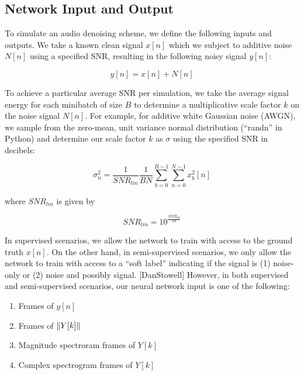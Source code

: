 
\subsection{Network Input and Output}
To simulate an audio denoising scheme, we define the following inputs and outputs. We take a known clean signal $x[n]$ which we subject to additive noise $N[n]$ using a specified SNR, resulting in the following noisy signal $y[n]$:

\begin{equation}
y[n] = x[n] + N[n]
\end{equation}

To achieve a particular average SNR per simulation, we take the average signal energy for each minibatch of size $B$ to determine a multiplicative scale factor $k$ on the noise signal $N[n]$. For example, for additive white Gaussian noise (AWGN), we sample from the zero-mean, unit variance normal distribution (``randn'' in Python) and determine our scale factor $k$ as $\sigma$ using the specified SNR in decibels:

\begin{equation}
\sigma_n^{2} = \dfrac{1}{SNR_{lin}}\dfrac{1}{BN}\sum_{b=0}^{B-1} \sum_{n=0}^{N-1} x_{b}^{2}[n]
\end{equation}

where $SNR_{lin}$ is given by

\begin{equation}
SNR_{lin} = 10^{\frac{SNR_{db}}{10}}
\end{equation}

In supervised scenarios, we allow the network to train with access to the ground truth $x[n]$. On the other hand, in semi-supervised scenarios, we only allow the network to train with access to a ``soft label'' indicating if the signal is (1) noise-only or (2) noise and possibly signal. [DanStowell] However, in both supervised and semi-supervised scenarios, our neural network input is one of the following:

\begin{enumerate}
    \item Frames of $y[n]$
    \item Frames of $\lVert Y[k]\rVert$
    \item Magnitude spectroram frames of $Y[k]$
    \item Complex spectrogram frames of $Y[k]$
\end{enumerate}

